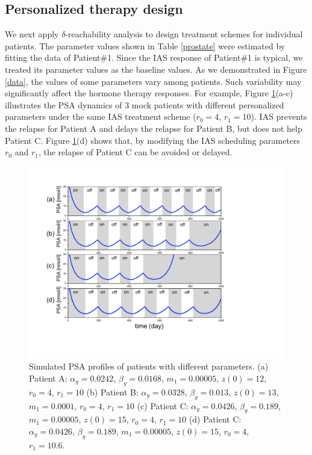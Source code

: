 \subsection{Personalized therapy design}
We next apply $\delta$-reachability analysis to design treatment schemes for individual patients. The parameter values shown in Table \ref{prostate} were estimated by fitting the data of Patient\#1. Since the IAS response of Patient\#1 is typical, we treated its parameter values as the baseline values. As we demonstrated in Figure \ref{data}, the values of some parameters vary among patients. Such variability may significantly affect the hormone therapy responses. 
For example, Figure \ref{patients}(a-c) illustrates the PSA dynamics of $3$ mock patients with different personalized parameters under the same IAS treatment scheme ($r_0=4$, $r_1=10$). IAS prevents the relapse for Patient A and delays the relapse for Patient B, but does not help Patient C. Figure \ref{patients}(d) shows that, by modifying the IAS scheduling parameters $r_0$ and $r_1$, the relapse of Patient C can be avoided or delayed. 

\begin{figure}[htb]
\centering
\includegraphics[scale=0.45]{fig-mock}
\caption{Simulated PSA profiles of patients with different parameters. (a) Patient A: $\alpha_y=0.0242$, $\beta_y=0.0168$, $m_1=0.00005$, $z(0)=12$, $r_0=4$, $r_1=10$ (b) Patient B: $\alpha_y=0.0328$, $\beta_y=0.013$, $z(0)=13$, $m_1=0.0001$, $r_0=4$, $r_1=10$ (c) Patient C: $\alpha_y=0.0426$, $\beta_y=0.189$, $m_1=0.00005$, $z(0)=15$, $r_0=4$, $r_1=10$ (d) Patient C: $\alpha_y=0.0426$, $\beta_y=0.189$, $m_1=0.00005$, $z(0)=15$, $r_0=4$, $r_1=10.6$.}
\label{patients}
\end{figure}

